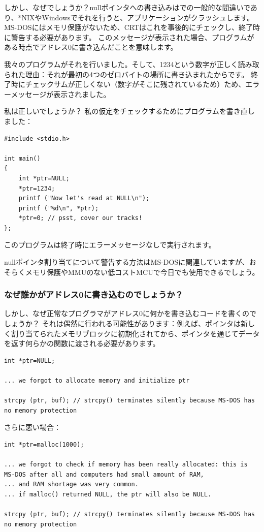 しかし、なぜでしょうか？nullポインタへの書き込みは\CCpp での一般的な間違いであり、*NIXやWindowsでそれを行うと、アプリケーションがクラッシュします。
MS-DOSにはメモリ保護がないため、\ac{CRT}はこれを事後的にチェックし、終了時に警告する必要があります。
このメッセージが表示された場合、プログラムがある時点でアドレス0に書き込んだことを意味します。

我々のプログラムがそれを行いました。そして、1234という数字が正しく読み取られた理由：それが最初の4つのゼロバイトの場所に書き込まれたからです。
終了時にチェックサムが正しくない（数字がそこに残されているため）ため、エラーメッセージが表示されました。

私は正しいでしょうか？
私の仮定をチェックするためにプログラムを書き直しました：

\begin{lstlisting}[style=customc]
#include <stdio.h>

int main()
{
	int *ptr=NULL;
	*ptr=1234;
	printf ("Now let's read at NULL\n");
	printf ("%d\n", *ptr);
	*ptr=0; // psst, cover our tracks!
};
\end{lstlisting}

このプログラムは終了時にエラーメッセージなしで実行されます。

nullポインタ割り当てについて警告する方法はMS-DOSに関連していますが、おそらくメモリ保護や\ac{MMU}のない低コスト\ac{MCU}で今日でも使用できるでしょう。

\subsubsection{なぜ誰かがアドレス0に書き込むのでしょうか？}

しかし、なぜ正常なプログラマがアドレス0に何かを書き込むコードを書くのでしょうか？
それは偶然に行われる可能性があります：例えば、ポインタは新しく割り当てられたメモリブロックに初期化されてから、ポインタを通じてデータを返す何らかの関数に渡される必要があります。

\begin{lstlisting}[style=customc]
int *ptr=NULL;

... we forgot to allocate memory and initialize ptr

strcpy (ptr, buf); // strcpy() terminates silently because MS-DOS has no memory protection
\end{lstlisting}

さらに悪い場合：

\begin{lstlisting}[style=customc]
int *ptr=malloc(1000);

... we forgot to check if memory has been really allocated: this is MS-DOS after all and computers had small amount of RAM,
... and RAM shortage was very common.
... if malloc() returned NULL, the ptr will also be NULL.

strcpy (ptr, buf); // strcpy() terminates silently because MS-DOS has no memory protection
\end{lstlisting}

